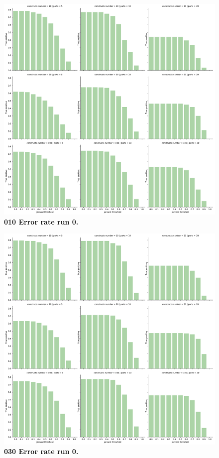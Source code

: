 \documentclass[11pt, a4paper]{article}
\begin{document}
  \begin{figure}[ht]
      \begin{center}
     \includegraphics[width=1\textwidth]{../results/images_notebook/v_006/010_true_positive.pdf}
     \end{center}
      \caption{{\bf 010 Error rate run 0. }}
     \label{fig:V_006_010}
 \end{figure}
 
   \begin{figure}[ht]
      \begin{center}
     \includegraphics[width=1\textwidth]{../results/images_notebook/v_006/030_true_positive.pdf}
     \end{center}
      \caption{{\bf 030 Error rate run 0. }}
     \label{fig:V_006_030}
 \end{figure}
 
\end{document}
